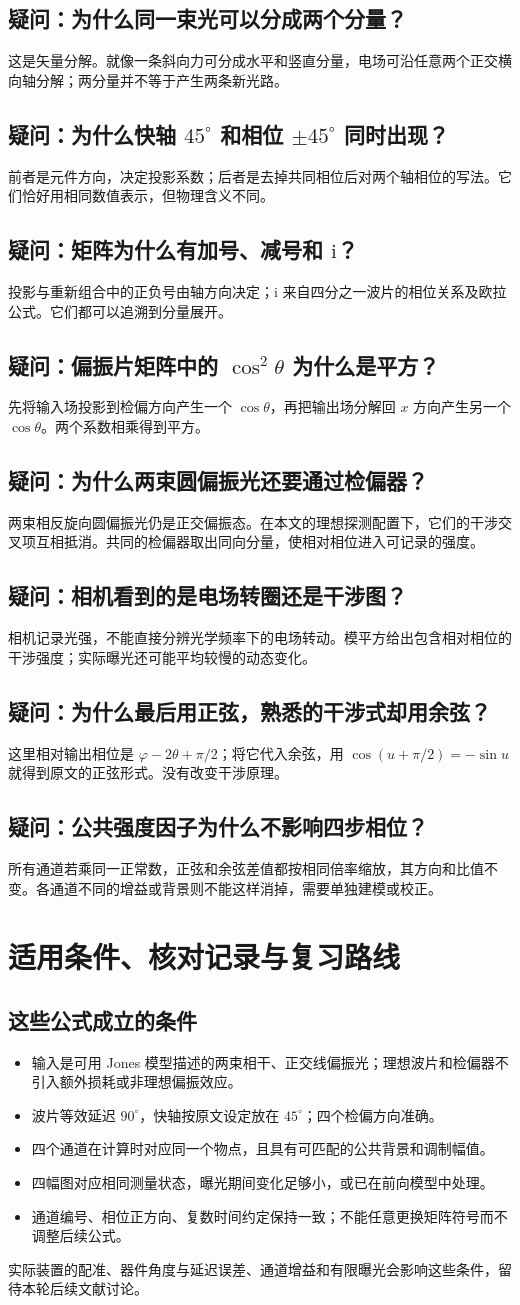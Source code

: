 \documentclass[UTF8,fontset=fandol,11pt,a4paper]{ctexart}
\newcommand{\ii}{\mathrm i}
\newcommand{\quest}[2]{\subsection*{疑问：#1}#2}
\begin{document}
\quest{为什么同一束光可以分成两个分量？}{
这是矢量分解。就像一条斜向力可分成水平和竖直分量，电场可沿任意两个正交横向轴分解；两分量并不等于产生两条新光路。}

\quest{为什么快轴 $45^\circ$ 和相位 $\pm45^\circ$ 同时出现？}{
前者是元件方向，决定投影系数；后者是去掉共同相位后对两个轴相位的写法。它们恰好用相同数值表示，但物理含义不同。}

\quest{矩阵为什么有加号、减号和 $\ii$？}{
投影与重新组合中的正负号由轴方向决定；$\ii$ 来自四分之一波片的相位关系及欧拉公式。它们都可以追溯到分量展开。}

\quest{偏振片矩阵中的 $\cos^2\theta$ 为什么是平方？}{
先将输入场投影到检偏方向产生一个 $\cos\theta$，再把输出场分解回 $x$ 方向产生另一个 $\cos\theta$。两个系数相乘得到平方。}

\quest{为什么两束圆偏振光还要通过检偏器？}{
两束相反旋向圆偏振光仍是正交偏振态。在本文的理想探测配置下，它们的干涉交叉项互相抵消。共同的检偏器取出同向分量，使相对相位进入可记录的强度。}

\quest{相机看到的是电场转圈还是干涉图？}{
相机记录光强，不能直接分辨光学频率下的电场转动。模平方给出包含相对相位的干涉强度；实际曝光还可能平均较慢的动态变化。}

\quest{为什么最后用正弦，熟悉的干涉式却用余弦？}{
这里相对输出相位是 $\varphi-2\theta+\pi/2$；将它代入余弦，用 $\cos(u+\pi/2)=-\sin u$ 就得到原文的正弦形式。没有改变干涉原理。}

\quest{公共强度因子为什么不影响四步相位？}{
所有通道若乘同一正常数，正弦和余弦差值都按相同倍率缩放，其方向和比值不变。各通道不同的增益或背景则不能这样消掉，需要单独建模或校正。}

\clearpage
\section{适用条件、核对记录与复习路线}
\subsection{这些公式成立的条件}
\begin{itemize}
\item 输入是可用 Jones 模型描述的两束相干、正交线偏振光；理想波片和检偏器不引入额外损耗或非理想偏振效应。
\item 波片等效延迟 $90^\circ$，快轴按原文设定放在 $45^\circ$；四个检偏方向准确。
\item 四个通道在计算时对应同一个物点，且具有可匹配的公共背景和调制幅值。
\item 四幅图对应相同测量状态，曝光期间变化足够小，或已在前向模型中处理。
\item 通道编号、相位正方向、复数时间约定保持一致；不能任意更换矩阵符号而不调整后续公式。
\end{itemize}
实际装置的配准、器件角度与延迟误差、通道增益和有限曝光会影响这些条件，留待本轮后续文献讨论。
\end{document}
